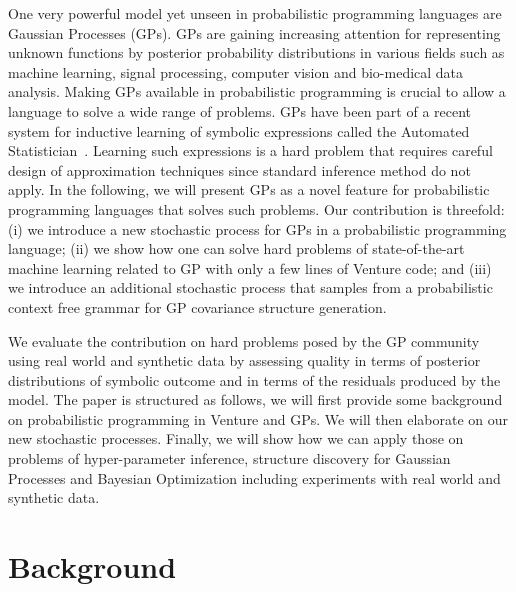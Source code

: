 \documentclass{article} %
\begin{document}
One very powerful model yet unseen in probabilistic programming languages are Gaussian Processes (GPs). GPs are gaining increasing attention for representing unknown functions by posterior probability distributions in various fields such as machine learning, signal processing, computer vision and bio-medical data analysis. Making GPs available in probabilistic programming is crucial to allow a language to solve a wide range of problems. GPs have been part of a recent system for inductive learning of symbolic expressions called the Automated Statistician~\cite{duvenaud2013structure,lloyd2014automatic}. Learning such expressions is a hard problem that requires careful design of approximation techniques since standard inference method do not apply. 
In the following, we will present GPs as a novel feature for probabilistic programming languages that solves such problems. Our contribution is threefold: (i) we introduce a new stochastic process for GPs in a probabilistic programming language; (ii) we show how one can solve hard problems  of state-of-the-art machine learning related to GP with only a few lines of Venture code; and (iii) we introduce an additional stochastic process that samples from a probabilistic context free grammar for GP covariance structure generation.

We evaluate the contribution on hard problems posed by the GP community using real world and synthetic data by assessing quality in terms of posterior distributions of symbolic outcome and in terms of the residuals produced by the model. 
The paper is structured as follows, we will first provide some background on probabilistic programming in Venture and GPs. We will then elaborate on our new stochastic processes. Finally, we will show how we can apply those on problems of hyper-parameter inference, structure discovery for Gaussian Processes and Bayesian Optimization including experiments with real world and synthetic data.
\section{Background}
\end{document}
